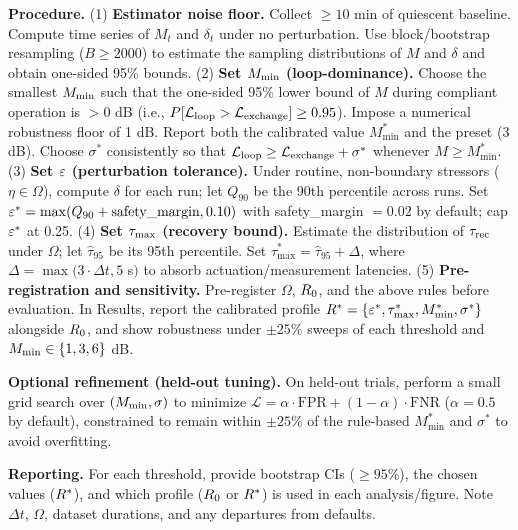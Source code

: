 \documentclass[11pt]{article}
\begin{document}
\textbf{Procedure.} (1) \textbf{Estimator noise floor.} Collect $\geq 10$ min of quiescent baseline. Compute time series of $M_t$ and $\delta_t$ under no perturbation. Use block/bootstrap resampling ($B \geq 2000$) to estimate the sampling distributions of $M$ and $\delta$ and obtain one-sided 95\% bounds. (2) \textbf{Set $M_{\min}$ (loop-dominance).} Choose the smallest $M_{\min}$ such that the one-sided 95\% lower bound of $M$ during compliant operation is $> 0$ dB (i.e., $P[\mathcal{L}_{\text{loop}} > \mathcal{L}_{\text{exchange}}] \geq 0.95$). Impose a numerical robustness floor of 1 dB. Report both the calibrated value $M^*_{\min}$ and the preset (3 dB). Choose $\sigma^*$ consistently so that $\mathcal{L}_{\text{loop}} \geq \mathcal{L}_{\text{exchange}} + \sigma^*$ whenever $M \geq M^*_{\min}$. (3) \textbf{Set $\varepsilon$ (perturbation tolerance).} Under routine, non-boundary stressors ($\eta \in \Omega$), compute $\delta$ for each run; let $Q_{90}$ be the 90th percentile across runs. Set $\varepsilon^* = \max(Q_{90} + \text{safety\_margin}, 0.10)$ with safety\_margin $= 0.02$ by default; cap $\varepsilon^*$ at 0.25. (4) \textbf{Set $\tau_{\max}$ (recovery bound).} Estimate the distribution of $\tau_{\text{rec}}$ under $\Omega$; let $\hat{\tau}_{95}$ be its 95th percentile. Set $\tau^*_{\max} = \hat{\tau}_{95} + \Delta$, where $\Delta = \max(3 \cdot \Delta t, 5$ s$)$ to absorb actuation/measurement latencies. (5) \textbf{Pre-registration and sensitivity.} Pre-register $\Omega$, $R_0$, and the above rules before evaluation. In Results, report the calibrated profile $R^* = \{\varepsilon^*, \tau^*_{\max}, M^*_{\min}, \sigma^*\}$ alongside $R_0$, and show robustness under $\pm 25\%$ sweeps of each threshold and $M_{\min} \in \{1, 3, 6\}$ dB.

\textbf{Optional refinement (held-out tuning).} On held-out trials, perform a small grid search over $(M_{\min}, \sigma)$ to minimize $\mathcal{L} = \alpha \cdot \text{FPR} + (1-\alpha) \cdot \text{FNR}$ ($\alpha = 0.5$ by default), constrained to remain within $\pm 25\%$ of the rule-based $M^*_{\min}$ and $\sigma^*$ to avoid overfitting.

\textbf{Reporting.} For each threshold, provide bootstrap CIs ($\geq 95\%$), the chosen values ($R^*$), and which profile ($R_0$ or $R^*$) is used in each analysis/figure. Note $\Delta t$, $\Omega$, dataset durations, and any departures from defaults.
\end{document}
